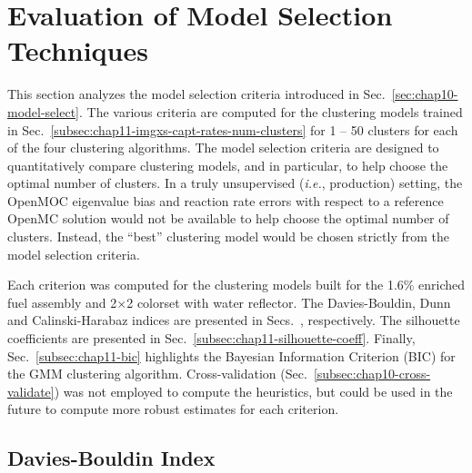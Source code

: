 \clearpage


\section{Evaluation of Model Selection Techniques}
\label{sec:chap11-model-select}

This section analyzes the model selection criteria introduced in Sec.~\ref{sec:chap10-model-select}. The various criteria are computed for the clustering models trained in Sec.~\ref{subsec:chap11-imgxs-capt-rates-num-clusters}  for 1 -- 50 clusters for each of the four clustering algorithms. The model selection criteria are designed to quantitatively compare clustering models, and in particular, to help choose the optimal number of clusters. In a truly unsupervised (\textit{i.e.}, production) setting, the OpenMOC eigenvalue bias and reaction rate errors with respect to a reference OpenMC solution would not be available to help choose the optimal number of clusters. Instead, the ``best'' clustering model would be chosen strictly from the model selection criteria.

Each criterion was computed for the clustering models built for the 1.6\% enriched fuel assembly and 2$\times$2 colorset with water reflector. The Davies-Bouldin, Dunn and Calinski-Harabaz indices are presented in Secs.~, respectively. The silhouette coefficients are presented in Sec.~\ref{subsec:chap11-silhouette-coeff}. Finally, Sec.~\ref{subsec:chap11-bic} highlights the Bayesian Information Criterion (BIC) for the \ac{GMM} clustering algorithm. Cross-validation (Sec.~\ref{subsec:chap10-cross-validate}) was not employed to compute the heuristics, but could be used in the future to compute more robust estimates for each criterion.	


\subsection{Davies-Bouldin Index}
\label{subsec:chap11-db-index}

